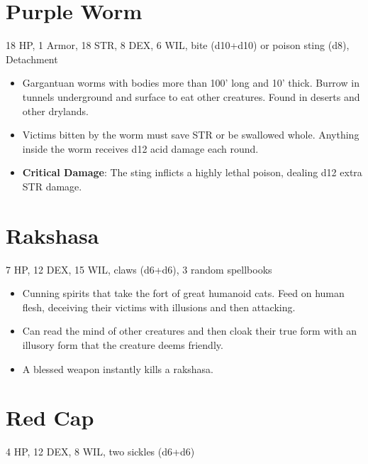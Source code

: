 \documentclass[
  10pt,
  american,
]{article}
\begin{document}
\hypertarget{purple-worm}{%
\section{Purple Worm}\label{purple-worm}}

18 HP, 1 Armor, 18 STR, 8 DEX, 6 WIL, bite (d10+d10) or poison sting
(d8), Detachment

\begin{samepage}
\begin{itemize}
\setlength\itemsep{-.5em}
\item Gargantuan worms with bodies more than 100' long and 10' thick. Burrow in tunnels underground and surface to eat other creatures. Found in deserts and other drylands.
\item Victims bitten by the worm must save STR or be swallowed whole. Anything inside the worm receives d12 acid damage each round.
\item \textbf{Critical Damage}: The sting inflicts a highly lethal poison, dealing d12 extra STR damage.
\end{itemize}
\end{samepage}

\hypertarget{rakshasa}{%
\section{Rakshasa}\label{rakshasa}}

7 HP, 12 DEX, 15 WIL, claws (d6+d6), 3 random spellbooks

\begin{samepage}
\begin{itemize}
\setlength\itemsep{-.5em}
\item Cunning spirits that take the fort of great humanoid cats. Feed on human flesh, deceiving their victims with illusions and then attacking.
\item Can read the mind of other creatures and then cloak their true form with an illusory form that the creature deems friendly.
\item A blessed weapon instantly kills a rakshasa.
\end{itemize}
\end{samepage}

\hypertarget{red-cap}{%
\section{Red Cap}\label{red-cap}}

4 HP, 12 DEX, 8 WIL, two sickles (d6+d6)
\end{document}
